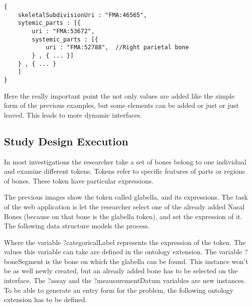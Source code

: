 



\begin{lstlisting}[captionpos=b, caption= data representing skull, label=skullJSON,
basicstyle=\footnotesize,frame=single]
{
	skeletalSubdivisionUri : "FMA:46565",
	sytemic_parts : [{
		uri : "FMA:53672",
		systemic_parts : [{
			uri : "FMA:52788",  //Right parietal bone
		} , { ... }]
	} , { ... }
	]	
}
\end{lstlisting}


Here the really important point the not only values are added like the simple form of the previous examples, but some elements can be added or just or just leaved. This leads to more dynamic
interfaces.

\subsection{Study Design Execution}




In most investigations the researcher take a set of bones belong to one individual and examine different tokens. Tokens refer to specific features of parts or regions of bones. These token have particular expressions.


The previous images show the token called glabella, and its expressions. The task of the web application is let the researcher select one of the already added Nasal Bones (because on that bone is the glabella token), and set the expression of it. The following data structure models the process.


Where the variable ?categoricalLabel represents the expression of the token. The values this variable can take are defined in the ontology extension. The variable ?boneSegment is the bone on which the glabella can be found. This instance won’t be as well newly created, but an already added bone has to be selected on the interface. The ?assay and the ?meausurementDatum variables are new instances.  To be able to generate an entry form for the problem, the following ontology extension has to be defined.



